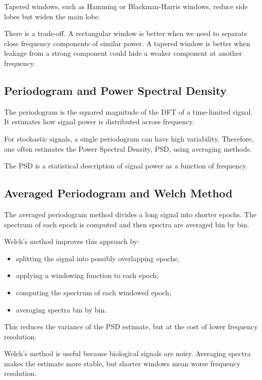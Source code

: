Tapered windows, such as Hamming or Blackman-Harris windows, reduce side lobes but widen the main lobe.

\begin{authornote}
There is a trade-off. A rectangular window is better when we need to separate close frequency components of similar power. A tapered window is better when leakage from a strong component could hide a weaker component at another frequency.
\end{authornote}

\subsection{Periodogram and Power Spectral Density}

The periodogram is the squared magnitude of the DFT of a time-limited signal. It estimates how signal power is distributed across frequency.

For stochastic signals, a single periodogram can have high variability. Therefore, one often estimates the Power Spectral Density, PSD, using averaging methods.

The PSD is a statistical description of signal power as a function of frequency.

\subsection{Averaged Periodogram and Welch Method}

The averaged periodogram method divides a long signal into shorter epochs. The spectrum of each epoch is computed and then spectra are averaged bin by bin.

Welch's method improves this approach by:

\begin{itemize}[noitemsep]
    \item splitting the signal into possibly overlapping epochs;
    \item applying a windowing function to each epoch;
    \item computing the spectrum of each windowed epoch;
    \item averaging spectra bin by bin.
\end{itemize}

This reduces the variance of the PSD estimate, but at the cost of lower frequency resolution.

\begin{authornote}
Welch's method is useful because biological signals are noisy. Averaging spectra makes the estimate more stable, but shorter windows mean worse frequency resolution.
\end{authornote}

